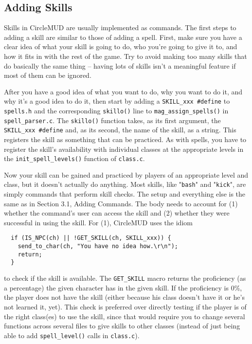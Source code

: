 \documentclass[11pt]{article}
\begin{document}
\subsection{Adding Skills}
Skills in CircleMUD are usually implemented as commands.  The first steps to adding a skill are similar to those of adding a spell.  First, make sure you have a clear idea of what your skill is going to do, who you're going to give it to, and how it fits in with the rest of the game.  Try to avoid making too many skills that do basically the same thing -- having lots of skills isn't a meaningful feature if most of them can be ignored.
\par
After you have a good idea of what you want to do, why you want to do it, and why it's a good idea to do it, then start by adding a \texttt{SKILL\_xxx \#define} to \texttt{spells.h} and the corresponding \texttt{skillo()} line to \texttt{mag\_assign\_spells()} in \texttt{spell\_parser.c}.  The \texttt{skillo()} function takes, as its first argument, the \texttt{SKILL\_xxx \#define} and, as its second, the name of the skill, as a string.  This registers the skill as something that can be practiced.  As with spells, you have to register the skill's availability with individual classes at the appropriate levels in the \texttt{init\_spell\_levels()} function of \texttt{class.c}.
\par
Now your skill can be gained and practiced by players of an appropriate level and class, but it doesn't actually do anything. Most skills, like "\texttt{bash}" and "\texttt{kick}", are simply commands that perform skill checks.  The setup and everything else is the same as in Section 3.1, Adding Commands.  The body needs to account for (1) whether the command's user can access the skill and (2) whether they were successful in using the skill.  For (1), CircleMUD uses the idiom
\begin{verbatim}
  if (IS_NPC(ch) || !GET_SKILL(ch, SKILL_xxx)) {
    send_to_char(ch, "You have no idea how.\r\n");
    return;
  }
\end{verbatim}
to check if the skill is available.  The \texttt{GET\_SKILL} macro returns the proficiency (as a percentage) the given character has in the given skill.  If the proficiency is 0\%, the player does not have the skill (either because his class doesn't have it or he's not learned it, yet).  This check is
preferred over directly testing if the player is of the right class(es) to use the skill, since that would require you to change several functions across several files to give skills to other classes (instead of just being able to add \texttt{spell\_level()} calls in \texttt{class.c}).
\end{document}
